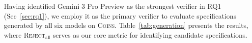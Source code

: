 








\label{sec:rq2}

Having identified Gemini 3 Pro Preview
as the strongest verifier in RQ1 (Sec~\ref{sec:rq1}), we employ it as the primary verifier to evaluate specifications generated by all six models on \textsc{Coins}. Table~\ref{tab:generation} presents the results, where \textsc{Reject}$_{\text{all}}$ serves as our core metric for identifying candidate specifications.

